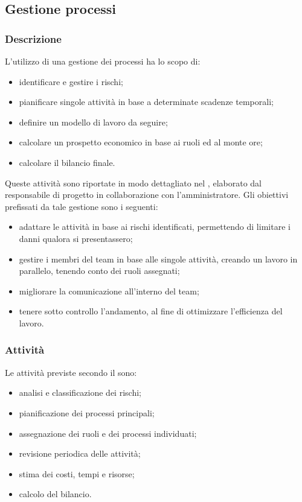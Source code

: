 \subsection{Gestione processi}

	\subsubsection{Descrizione}
	L'utilizzo di una gestione dei processi ha lo scopo di:
	\begin{itemize}
		\item identificare e gestire i rischi;
		\item pianificare singole attività in base a determinate scadenze temporali;
		\item definire un modello di lavoro da seguire;
		\item calcolare un prospetto economico in base ai ruoli ed al monte ore;
		\item calcolare il bilancio finale.
	\end{itemize}
	Queste attività sono riportate in modo dettagliato nel , elaborato dal responsabile di progetto in collaborazione con l'amministratore.
	Gli obiettivi prefissati da tale gestione sono i seguenti:
	\begin{itemize}
		\item adattare le attività in base ai rischi identificati, permettendo di limitare i danni qualora si presentassero;
		\item gestire i membri del team in base alle singole attività, creando un lavoro in parallelo, tenendo conto dei ruoli assegnati;
		\item migliorare la comunicazione all'interno del team;
		\item tenere sotto controllo l'andamento, al fine di ottimizzare l'efficienza del lavoro.
	\end{itemize}

	\subsubsection{Attività}
	Le attività previste secondo il  sono:
	\begin{itemize}
		\item analisi e classificazione dei rischi;
		\item pianificazione dei processi principali;
		\item assegnazione dei ruoli e dei processi individuati;
		\item revisione periodica delle attività;
		\item stima dei costi, tempi e risorse;
		\item calcolo del bilancio.
	\end{itemize}

